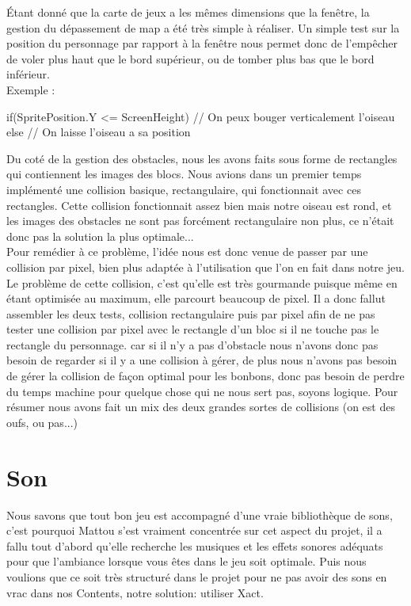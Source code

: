 \documentclass [11pt]{report}
\begin{document}
		\indent Étant donné que la carte de jeux a les mêmes dimensions que la fenêtre, la gestion du dépassement de map a été très simple à réaliser. Un simple test sur la position du personnage par rapport à la fenêtre nous permet donc de l'empêcher de voler plus haut que le bord supérieur, ou de tomber plus bas que le bord inférieur. \\


	\newpage
		\noindent Exemple :
		
		\begin{mylisting}
		
if(SpritePosition.Y <= ScreenHeight)
{
	// On peux bouger verticalement l'oiseau
}
else
{
	// On laisse l'oiseau a sa position
}
		\end{mylisting}
	\vspace{10mm}
		
				
		\indent Du coté de la gestion des obstacles, nous les avons faits sous forme de rectangles qui contiennent les images des blocs. Nous avions dans un premier temps implémenté une collision basique, rectangulaire, qui fonctionnait avec ces rectangles. Cette collision fonctionnait assez bien mais notre oiseau est rond, et les images des obstacles ne sont pas forcément rectangulaire non plus, ce n'était donc pas la solution la plus optimale... \\
		\indent Pour remédier à ce problème, l'idée nous est donc venue de passer par une collision par pixel, bien plus adaptée à l'utilisation que l'on en fait dans notre jeu. Le problème de cette collision, c'est qu'elle est très gourmande puisque même en étant optimisée au maximum, elle parcourt beaucoup de pixel. Il a donc fallut assembler les deux tests, collision rectangulaire puis par pixel afin de ne pas tester une collision par pixel avec le rectangle d'un bloc si il ne touche pas le rectangle du personnage. car si il n'y a pas d'obstacle nous n'avons donc pas besoin de regarder si il y a une collision à gérer, de plus nous n'avons pas besoin de gérer la collision de façon optimal pour les bonbons, donc pas besoin de perdre du temps machine pour quelque chose qui ne nous sert pas, soyons logique. Pour résumer nous avons fait un mix des deux grandes sortes de collisions (on est des oufs, ou pas...)
		
		\newpage
	
	\section{Son}
		Nous savons que tout bon jeu est accompagné d'une vraie bibliothèque de sons, c'est pourquoi Mattou s'est vraiment concentrée sur cet aspect du projet, il a fallu tout d'abord qu'elle recherche les musiques et les effets sonores adéquats pour que l'ambiance lorsque vous êtes dans le jeu soit optimale. Puis nous voulions que ce soit très structuré dans le projet pour ne pas avoir des sons en vrac dans nos Contents, notre solution: utiliser Xact. \\
		
\end{document}
